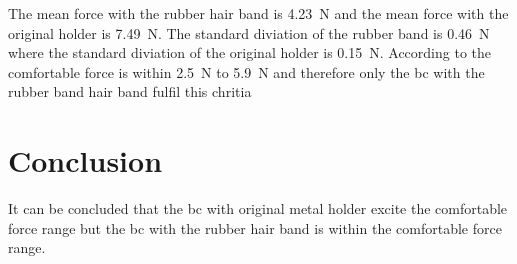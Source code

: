 The mean force with the rubber hair band is \SI{4.23}{\newton} and the mean force with the original holder is \SI{7.49}{\newton}. The standard diviation of the rubber band is \SI{0.46}{\newton} where the standard diviation of the original holder is \SI{0.15}{\newton}. According to \citep{ANSI_S35} the comfortable force is within \SI{2.5}{\newton} to \SI{5.9}{\newton} and therefore only the \gls{bc} with the rubber band hair band fulfil this chritia 

\section*{Conclusion}

It can be concluded that the \gls{bc} with original metal holder excite the comfortable force range but the \gls{bc} with the rubber hair band is within the comfortable force range.



